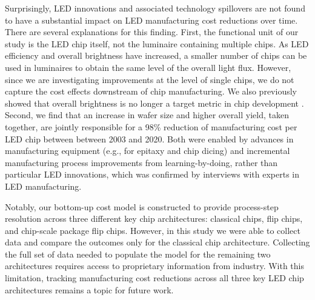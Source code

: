 \documentclass[parskip=full]{article}
\begin{document}
Surprisingly, LED innovations and associated technology spillovers are not found to have a substantial impact on LED manufacturing cost reductions over time. There are several explanations for this finding. First, the functional unit of our study is the LED chip itself, not the luminaire containing multiple chips. As LED efficiency and overall brightness have increased, a smaller number of chips can be used in luminaires to obtain the same level of the overall light flux. However, since we are investigating improvements at the level of single chips, we do not capture the cost effects downstream of chip manufacturing. We also previously showed that overall brightness is no longer a target metric in chip development \cite{weinold2021compound}. Second, we find that an increase in wafer size and higher overall yield, taken together, are jointly responsible for a 98\% reduction of manufacturing cost per LED chip between between 2003 and 2020. Both were enabled by advances in manufacturing equipment (e.g., for epitaxy and chip dicing) and incremental manufacturing process improvements from learning-by-doing, rather than particular LED innovations, which was confirmed by interviews with experts in LED manufacturing. 

Notably, our bottom-up cost model is constructed to provide process-step resolution across three different key chip architectures: classical chips, flip chips, and chip-scale package flip chips. However, in this study we were able to collect data and compare the outcomes only for the classical chip architecture. Collecting the full set of data needed to populate the model for the remaining two architectures requires access to proprietary information from industry. With this limitation, tracking manufacturing cost reductions across all three key LED chip architectures remains a topic for future work.
\end{document}
